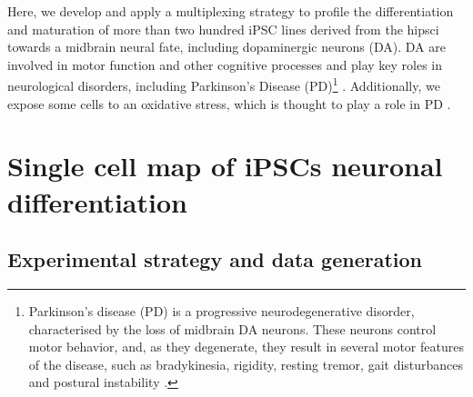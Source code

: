 Here, we develop and apply a multiplexing strategy to profile the differentiation and maturation of more than two hundred iPSC lines derived from the \gls{hipsci} towards a midbrain neural fate, including dopaminergic neurons (DA). 
DA are involved in motor function and other cognitive processes and play key roles in neurological disorders, including Parkinson’s Disease (PD)\footnote{Parkinson’s disease (PD) is a progressive neurodegenerative disorder, characterised by the loss of midbrain DA neurons. 
These neurons control motor behavior, and, as they degenerate, they result in several motor features of the disease, such as bradykinesia, rigidity, resting tremor, gait disturbances and postural instability \cite{lees2009parkinsons}.} \cite{osborn2017seq, stoddard2020stem}. 
Additionally, we expose some cells to an oxidative stress, which is thought to play a role in PD \cite{xiong2012mitochondrial}.




\newpage

\section{Single cell map of iPSCs neuronal differentiation}
\label{sec:neuroseq_overview}

\subsection{Experimental strategy and data generation}

